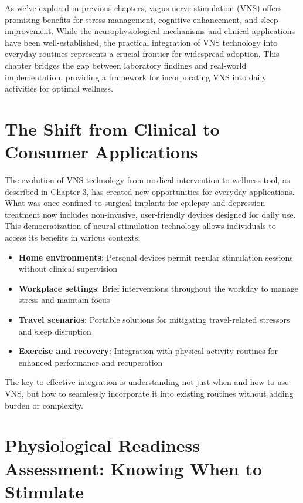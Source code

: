 \documentclass[
  Letterpaper,
]{scrbook}
\providecommand{\tightlist}{%
  \setlength{\itemsep}{0pt}\setlength{\parskip}{0pt}}\usepackage{longtable,booktabs,array}
\begin{document}
As we've explored in previous chapters, vagus nerve stimulation (VNS)
offers promising benefits for stress management, cognitive enhancement,
and sleep improvement. While the neurophysiological mechanisms and
clinical applications have been well-established, the practical
integration of VNS technology into everyday routines represents a
crucial frontier for widespread adoption. This chapter bridges the gap
between laboratory findings and real-world implementation, providing a
framework for incorporating VNS into daily activities for optimal
wellness.

\section{The Shift from Clinical to Consumer
Applications}\label{the-shift-from-clinical-to-consumer-applications}

The evolution of VNS technology from medical intervention to wellness
tool, as described in Chapter 3, has created new opportunities for
everyday applications. What was once confined to surgical implants for
epilepsy and depression treatment now includes non-invasive,
user-friendly devices designed for daily use. This democratization of
neural stimulation technology allows individuals to access its benefits
in various contexts:

\begin{itemize}
\tightlist
\item
  \textbf{Home environments}: Personal devices permit regular
  stimulation sessions without clinical supervision
\item
  \textbf{Workplace settings}: Brief interventions throughout the
  workday to manage stress and maintain focus
\item
  \textbf{Travel scenarios}: Portable solutions for mitigating
  travel-related stressors and sleep disruption
\item
  \textbf{Exercise and recovery}: Integration with physical activity
  routines for enhanced performance and recuperation
\end{itemize}

The key to effective integration is understanding not just when and how
to use VNS, but how to seamlessly incorporate it into existing routines
without adding burden or complexity.

\section{Physiological Readiness Assessment: Knowing When to
Stimulate}\label{physiological-readiness-assessment-knowing-when-to-stimulate}
\end{document}
